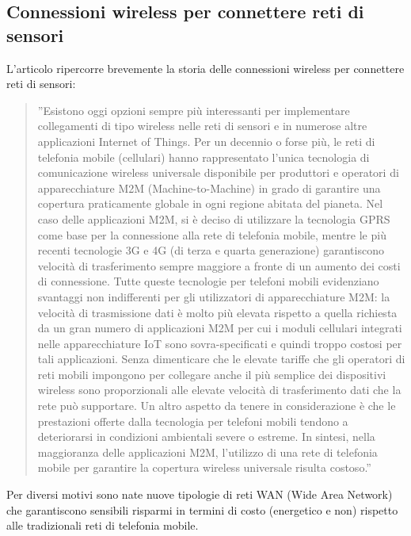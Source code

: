 \documentclass[a4paper]{report} %
\begin{document}
\subsection{Connessioni wireless per connettere reti di sensori}
L'articolo \cite{art:rif.23} ripercorre brevemente la storia delle connessioni wireless per connettere reti di sensori:
\begin{quote}
	''Esistono oggi opzioni sempre più interessanti per implementare collegamenti di tipo wireless nelle reti di sensori e in numerose altre applicazioni Internet of Things. Per un decennio o forse più, le reti di telefonia mobile (cellulari) hanno rappresentato l'unica tecnologia di comunicazione wireless universale disponibile per produttori e operatori di apparecchiature M2M (Machine-to-Machine) in grado di garantire una copertura praticamente globale in ogni regione abitata del pianeta. Nel caso delle applicazioni M2M, si è deciso di utilizzare la tecnologia GPRS come base per la connessione alla rete di telefonia mobile, mentre le più recenti tecnologie 3G e 4G (di terza e quarta generazione) garantiscono velocità di trasferimento sempre maggiore a fronte di un aumento dei costi di connessione. Tutte queste tecnologie per telefoni mobili evidenziano svantaggi non indifferenti per gli utilizzatori di apparecchiature M2M: la velocità di trasmissione dati è molto più elevata rispetto a quella richiesta da un gran numero di applicazioni M2M per cui i moduli cellulari integrati nelle apparecchiature IoT sono sovra-specificati e quindi troppo costosi per tali applicazioni. Senza dimenticare che le elevate tariffe che gli operatori di reti mobili impongono per collegare anche il più semplice dei dispositivi wireless sono proporzionali alle elevate velocità di trasferimento dati che la rete può supportare. Un altro aspetto da tenere in considerazione è che le prestazioni offerte dalla tecnologia per telefoni mobili tendono a deteriorarsi in condizioni ambientali severe o estreme. In sintesi, nella maggioranza delle applicazioni M2M, l'utilizzo di una rete di telefonia mobile per garantire la copertura wireless universale risulta costoso.''
\end{quote}
Per diversi motivi sono nate nuove tipologie di reti WAN (Wide Area Network) che garantiscono sensibili risparmi in termini di costo (energetico e non) rispetto alle tradizionali reti di telefonia mobile.
\end{document}
